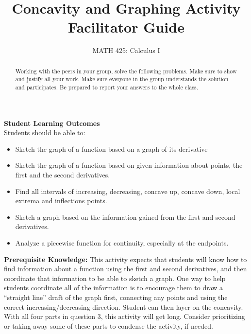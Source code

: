 \documentclass{ximera}
\title{Concavity and Graphing Activity Facilitator Guide }
\author{MATH 425: Calculus I}
\begin{document}
\begin{abstract}
   Working with the peers in your group, solve the following problems. Make sure to show and justify all your work. Make sure everyone in the group understands the solution and participates. Be prepared to report your answers to the whole class. 
\end{abstract}
\maketitle

\textbf{Student Learning Outcomes}\\
Students should be able to:
    \begin{itemize}
        \item Sketch the graph of a function based on a graph of its derivative
        \item Sketch the graph of a function based on given information about points, the first and the second derivatives.
        \item Find all intervals of increasing, decreasing, concave up, concave down, local extrema and inflections points.
        \item Sketch a graph based on the information gained from the first and second derivatives.
        \item Analyze a piecewise function for continuity, especially at the endpoints.
    \end{itemize}

\textbf{Prerequisite Knowledge:} This activity expects that students will know how to find information about a function using the first and second derivatives, and then coordinate that information to be able to sketch a graph.  One way to help students coordinate all of the information is to encourage them to draw a ``straight line'' draft of the graph first, connecting any points and using the correct increasing/decreasing direction. Student can then layer on the concavity. \\

With all four parts in question 3, this activity will get long.  Consider prioritizing or taking away some of these parts to condense the activity, if needed.
\end{document}
